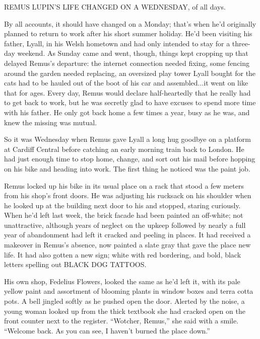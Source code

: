 

REMUS LUPIN’S LIFE CHANGED ON A WEDNESDAY, of all days.

By all accounts, it should have changed on a Monday; that’s when he’d originally planned to return to work after his short summer holiday. He’d been visiting his father, Lyall, in his Welsh hometown and had only intended to stay for a three-day weekend. As Sunday came and went, though, things kept cropping up that delayed Remus’s departure: the internet connection needed fixing, some fencing around the garden needed replacing, an oversized play tower Lyall bought for the cats had to be hauled out of the boot of his car and assembled...it went on like that for ages. Every day, Remus would declare half-heartedly that he really had to get back to work, but he was secretly glad to have excuses to spend more time with his father. He only got back home a few times a year, busy as he was, and knew the missing was mutual.

So it was Wednesday when Remus gave Lyall a long hug goodbye on a platform at Cardiff Central before catching an early morning train back to London. He had just enough time to stop home, change, and sort out his mail before hopping on his bike and heading into work.
The first thing he noticed was the paint job.

Remus locked up his bike in its usual place on a rack that stood a few meters from his shop’s front doors. He was adjusting his rucksack on his shoulder when he looked up at the building next door to his and stopped, staring curiously. When he’d left last week, the brick facade had been painted an off-white; not unattractive, although years of neglect on the upkeep followed by nearly a full year of abandonment had left it cracked and peeling in places. It had received a makeover in Remus’s absence, now painted a slate gray that gave the place new life. It had also gotten a new sign; white with red bordering, and bold, black letters spelling out BLACK DOG TATTOOS.

His own shop, Fedelius Flowers, looked the same as he’d left it, with its pale yellow paint and assortment of blooming plants in window boxes and terra cotta pots. A bell jingled softly as he pushed open the door. Alerted by the noise, a young woman looked up from the thick textbook she had cracked open on the front counter next to the register. “Wotcher, Remus,” she said with a smile. “Welcome back. As you can see, I haven’t burned the place down.”

